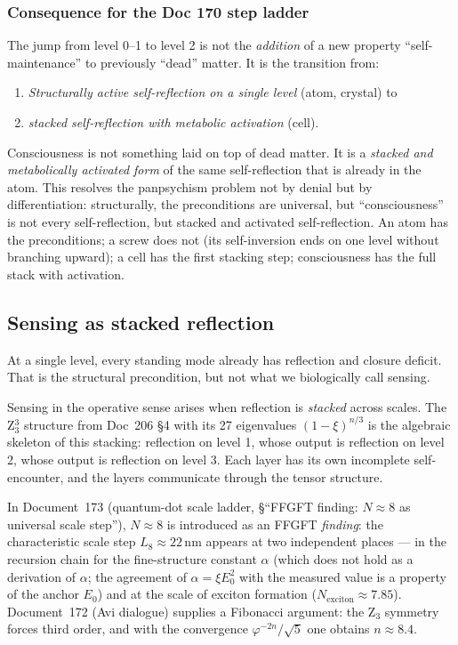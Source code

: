 \subsubsection*{Consequence for the Doc 170 step ladder}

The jump from level 0--1 to level 2 is not the \emph{addition} of a new property ``self-maintenance'' to previously ``dead'' matter. It is the transition from:

\begin{enumerate}
\item \emph{Structurally active self-reflection on a single level} (atom, crystal) to
\item \emph{stacked self-reflection with metabolic activation} (cell).
\end{enumerate}

\begin{interpretation}
Consciousness is not something laid on top of dead matter. It is a \emph{stacked and metabolically activated form} of the same self-reflection that is already in the atom. This resolves the panpsychism problem not by denial but by differentiation: structurally, the preconditions are universal, but ``consciousness'' is not every self-reflection, but stacked and activated self-reflection. An atom has the preconditions; a screw does not (its self-inversion ends on one level without branching upward); a cell has the first stacking step; consciousness has the full stack with activation.
\end{interpretation}

\subsection{Sensing as stacked reflection}\label{sec:reflection_stack}

At a single level, every standing mode already has reflection and closure deficit. That is the structural precondition, but not what we biologically call sensing.

Sensing in the operative sense arises when reflection is \emph{stacked} across scales. The Z$_3^3$ structure from Doc~206 \S4 with its 27 eigenvalues $(1-\xi)^{n/3}$ is the algebraic skeleton of this stacking: reflection on level 1, whose output is reflection on level 2, whose output is reflection on level 3. Each layer has its own incomplete self-encounter, and the layers communicate through the tensor structure.

In Document~173 (quantum-dot scale ladder, \S``FFGFT finding: $N \approx 8$ as universal scale step''), $N \approx 8$ is introduced as an FFGFT \emph{finding}: the characteristic scale step $L_8 \approx 22$\,nm appears at two independent places --- in the recursion chain for the fine-structure constant $\alpha$ (which does not hold as a derivation of $\alpha$; the agreement of $\alpha = \xi E_0^2$ with the measured value is a property of the anchor $E_0$) and at the scale of exciton formation ($N_{\text{exciton}} \approx 7.85$). Document~172 (Avi dialogue) supplies a Fibonacci argument: the Z$_3$ symmetry forces third order, and with the convergence $\varphi^{-2n}/\sqrt{5}$ one obtains $n \approx 8.4$.

